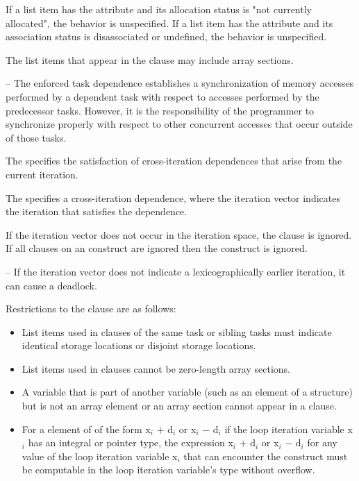 {{{{\fortranspecificstart
If a list item has the  attribute and its allocation
status is "not currently allocated", the behavior is unspecified. If a
list item has the  attribute and its association status
is disassociated or undefined, the behavior is unspecified.
\fortranspecificend

The list items that appear in the  clause may include array sections.

\notestart
\noteheader – The enforced task dependence establishes a synchronization of memory 
accesses performed by a dependent task with respect to accesses performed by the 
predecessor tasks. However, it is the responsibility of the programmer to synchronize properly with respect to other concurrent accesses that occur outside of those tasks.
\noteend

The   specifies the satisfaction of
cross-iteration dependences that arise from the current iteration.

The   specifies a cross-iteration dependence,
where the iteration vector  indicates the iteration that satisfies
the dependence.

If the iteration vector  does not occur in the iteration space,
the  clause is ignored.  If all  clauses on an
 construct are ignored then the construct is ignored.

\notestart
\noteheader – If the iteration vector  does not indicate a lexicographically earlier iteration, it can cause a deadlock.
\noteend

\restrictions
Restrictions to the  clause are as follows:

\begin{itemize}
\item List items used in  clauses of the same task or sibling tasks must indicate 
identical storage locations or disjoint storage locations. 

\item List items used in  clauses cannot be zero-length array sections. 

\item A variable that is part of another variable (such as an element of a structure) but is not an 
array element or an array section cannot appear in a  clause.

\item For a  element of   of the form
x$_{i}$ $+$ d$_{i}$ or x$_{i}$ $-$ d$_{i}$ if the loop iteration variable
x$_{i}$ has an integral or pointer type, the expression x$_{i}$ $+$ d$_{i}$ or
x$_{i}$ $-$ d$_{i}$ for any value of the loop iteration variable x$_{i}$ that
can encounter the  construct must be computable in the
loop iteration variable's type without overflow.


\end{itemize}}}}}
